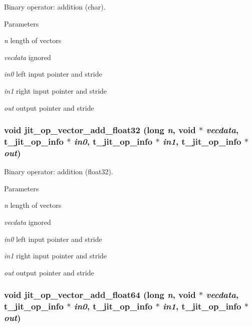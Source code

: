 Binary operator: addition (char). 
\begin{DoxyParams}{Parameters}
\item[{\em n}]length of vectors \item[{\em vecdata}]ignored \item[{\em in0}]left input pointer and stride \item[{\em in1}]right input pointer and stride \item[{\em out}]output pointer and stride \end{DoxyParams}
\hypertarget{group__opvecmod_ga30cfcfb6333f08dda447d2ce64fe0326}{
\subsubsection[{jit\_\-op\_\-vector\_\-add\_\-float32}]{\setlength{\rightskip}{0pt plus 5cm}void jit\_\-op\_\-vector\_\-add\_\-float32 (long {\em n}, \/  void $\ast$ {\em vecdata}, \/  {\bf t\_\-jit\_\-op\_\-info} $\ast$ {\em in0}, \/  {\bf t\_\-jit\_\-op\_\-info} $\ast$ {\em in1}, \/  {\bf t\_\-jit\_\-op\_\-info} $\ast$ {\em out})}}
\label{group__opvecmod_ga30cfcfb6333f08dda447d2ce64fe0326}


Binary operator: addition (float32). 
\begin{DoxyParams}{Parameters}
\item[{\em n}]length of vectors \item[{\em vecdata}]ignored \item[{\em in0}]left input pointer and stride \item[{\em in1}]right input pointer and stride \item[{\em out}]output pointer and stride \end{DoxyParams}
\hypertarget{group__opvecmod_gacd8f8cd6465da63a372b0b613d6da9ff}{
\subsubsection[{jit\_\-op\_\-vector\_\-add\_\-float64}]{\setlength{\rightskip}{0pt plus 5cm}void jit\_\-op\_\-vector\_\-add\_\-float64 (long {\em n}, \/  void $\ast$ {\em vecdata}, \/  {\bf t\_\-jit\_\-op\_\-info} $\ast$ {\em in0}, \/  {\bf t\_\-jit\_\-op\_\-info} $\ast$ {\em in1}, \/  {\bf t\_\-jit\_\-op\_\-info} $\ast$ {\em out})}}
\label{group__opvecmod_gacd8f8cd6465da63a372b0b613d6da9ff}


